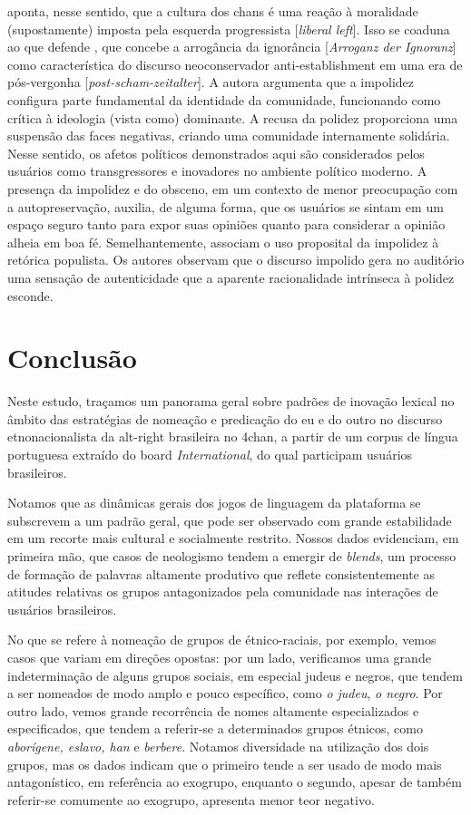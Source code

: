\documentclass[portuguese]{textolivre}
\begin{document}
\textcite{nagle2017kill} aponta, nesse sentido, que a cultura dos chans é uma reação à moralidade (supostamente) imposta pela esquerda progressista [\emph{liberal left}]. Isso se coaduna ao que defende \textcite{wodak2018rand}, que concebe a arrogância da ignorância [\emph{Arroganz der Ignoranz}] como característica do discurso neoconservador anti-establishment em uma era de pós-vergonha [\emph{post-scham-zeitalter}]. A autora argumenta que a impolidez configura parte fundamental da identidade da comunidade, funcionando como crítica à ideologia (vista como) dominante. A recusa da polidez proporciona uma suspensão das faces negativas, criando uma comunidade internamente solidária. Nesse sentido, os afetos políticos demonstrados aqui são considerados pelos usuários como transgressores e inovadores no ambiente político moderno. A presença da impolidez e do obsceno, em um contexto de menor preocupação com a autopreservação, auxilia, de alguma forma, que os usuários se sintam em um espaço seguro tanto para expor suas opiniões quanto para considerar a opinião alheia em boa fé. Semelhantemente, \textcite{wodak2021shameless} associam o uso proposital da impolidez à retórica populista. Os autores observam que o discurso impolido gera no auditório uma sensação de autenticidade que a aparente racionalidade intrínseca à polidez esconde.


\section{Conclusão}

Neste estudo, traçamos um panorama geral sobre padrões de inovação lexical no âmbito das estratégias de nomeação e predicação do eu e do outro no discurso etnonacionalista da alt-right brasileira no 4chan, a partir de um corpus de língua portuguesa extraído do board \emph{International}, do qual participam usuários brasileiros.

Notamos que as dinâmicas gerais dos jogos de linguagem da plataforma se subscrevem a um padrão geral, que pode ser observado com grande estabilidade em um recorte mais cultural e socialmente restrito. Nossos dados evidenciam, em primeira mão, que casos de neologismo tendem a emergir de \emph{blends}, um processo de formação de palavras altamente produtivo que reflete consistentemente as atitudes relativas os grupos antagonizados pela comunidade nas interações de usuários brasileiros.

No que se refere à nomeação de grupos de étnico-raciais, por exemplo, vemos casos que variam em direções opostas: por um lado, verificamos uma grande indeterminação de alguns grupos sociais, em especial judeus e negros, que tendem a ser nomeados de modo amplo e pouco específico, como \emph{o judeu}, \emph{o negro}. Por outro lado, vemos grande recorrência de nomes altamente especializados e especificados, que tendem a referir-se a determinados grupos étnicos, como \emph{aborígene, eslavo, han} e \emph{berbere}. Notamos diversidade na utilização dos dois grupos, mas os dados indicam que o primeiro tende a ser usado de modo mais antagonístico, em referência ao exogrupo, enquanto o segundo, apesar de também referir-se comumente ao exogrupo, apresenta menor teor negativo. 
\end{document}
